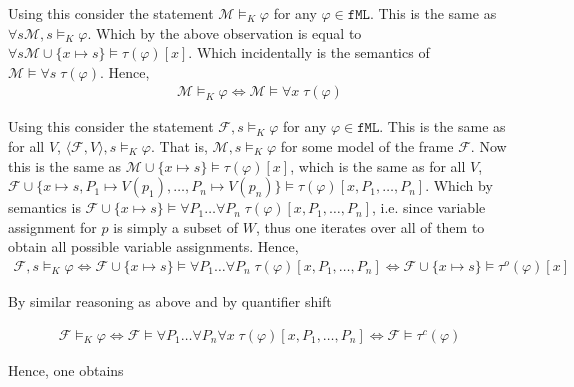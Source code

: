 \documentclass[11pt,a4paper]{article}
\begin{document}
Using this consider the statement $\mathcal{M} \models_{K} \varphi $ for any $\varphi \in \mathtt{fML} $. This is the same as $\forall s \mathcal{M},s \models_{K} \varphi $. Which by the above observation is equal to $\forall s \mathcal{M} \cup \{ x \mapsto s\} \models \tau(\varphi)[x]$. Which incidentally is the semantics of $\mathcal{M}  \models \forall s \; \tau(\varphi) $. Hence,
\begin{equation*}
\begin{split}
\mathcal{M} \models_{K} \varphi \iff\mathcal{M}  \models \forall x\; \tau(\varphi) 
\end{split}
\end{equation*}

Using this consider the statement $\mathcal{F} ,s\models_{K} \varphi $ for any $\varphi \in \mathtt{fML} $. This is the same as for all $V$, $ \langle \mathcal{F}, V \rangle , s \models_{K} \varphi $. That is, $\mathcal{M} , s \models_{K} \varphi $ for some model of the frame $\mathcal{F}$. Now this is the same as $\mathcal{M} \cup \{x \mapsto s\} \models \tau(\varphi)[x]$, which is the same as for all $V$, $\mathcal{F} \cup \{x \mapsto s,P_1 \mapsto V(p_1), \dots, P_n \mapsto V(p_n)\} \models \tau(\varphi)[x,P_1 ,\dots , P_n]$. Which by semantics is $\mathcal{F} \cup \{x \mapsto s\} \models \forall P_1 \dots \forall P_n \; \tau(\varphi)[x,P_1 ,\dots , P_n]$, i.e. since variable assignment for $p$ is simply a subset of $W$, thus one iterates over all of them to obtain all possible variable assignments. Hence,
\begin{equation*}
\begin{split}
\mathcal{F},s \models_{K} \varphi \iff \mathcal{F} \cup \{x \mapsto s\} \models \forall P_1 \dots \forall P_n \; \tau(\varphi)[x,P_1 ,\dots , P_n]
\iff \mathcal{F} \cup \{x \mapsto s\} \models \tau^o(\varphi)[x]
\end{split}
\end{equation*}

By similar reasoning as above and by quantifier shift 

\begin{equation*}
\begin{split}
\mathcal{F} \models_{K} \varphi \iff \mathcal{F} \models \forall P_1 \dots \forall P_n \forall x \; \tau(\varphi)[x,P_1 ,\dots , P_n]
\iff \mathcal{F} \models \tau^c(\varphi)
\end{split}
\end{equation*}

Hence,  one obtains 
\end{document}
